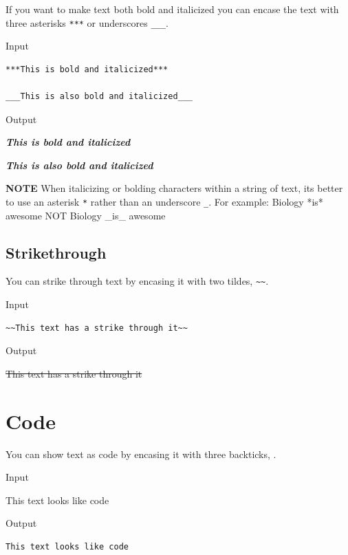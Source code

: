\documentclass[
]{book}
\begin{document}
If you want to make text both bold and italicized you can encase the text with three asterisks \texttt{***} or underscores \texttt{\_\_\_}.

Input

\begin{verbatim}
***This is bold and italicized***

___This is also bold and italicized___
\end{verbatim}

Output

\textbf{\emph{This is bold and italicized}}

\textbf{\emph{This is also bold and italicized}}

\textbf{NOTE} When italicizing or bolding characters within a string of text, it\textquotesingle s better to use an asterisk \texttt{*} rather than an underscore \texttt{\_}. For example: Biology *is* awesome NOT Biology \_is\_ awesome

\subsection*{Strikethrough}\label{strikethrough}

You can strike through text by encasing it with two tildes, \texttt{\textasciitilde{}\textasciitilde{}}.

Input

\begin{verbatim}
~~This text has a strike through it~~
\end{verbatim}

Output

\st{This text has a strike through it}

\section{Code}\label{code}

You can show text as code by encasing it with three backticks, \texttt{\textasciigrave{}\textasciigrave{}\textasciigrave{}}.

Input

\texttt{\textasciigrave{}\textasciigrave{}\textasciigrave{}}

This text looks like code

\texttt{\textasciigrave{}\textasciigrave{}\textasciigrave{}}

Output

\begin{verbatim}
This text looks like code
\end{verbatim}
\end{document}
